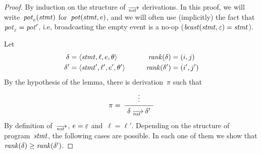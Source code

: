 
\lemranknst*
\begin{proof}
  By induction on the structure of $\nst$ derivations.  In this proof, we
  will write~$\operatorname{\mathit{pot}}_e(\mathit{stmt})$ for~$\operatorname{\mathit{pot}}(\mathit{stmt},e)$, and we will often use
  (implicitly) the fact that~$\operatorname{\mathit{pot}}_\varepsilon=\operatorname{\mathit{pot}}'$, i.e, broadcasting the empty
  event is a no-op ($\operatorname{\mathit{bcast}}(\mathit{stmt},\varepsilon)=\mathit{stmt}$).

  Let
  \begin{alignat*}{2}
    \delta&=\<\stmt,\ell,e,\theta>      &\qquad\rank(\delta)&=(i,j)\\
    \delta'&=\<\stmt',\ell',e',\theta'> &\qquad\rank(\delta')&=(i',j')
  \end{alignat*}
  By the hypothesis of the lemma, there is derivation~$\pi$ such that
  \[
    \AxiomC{\strut$\vdots$}
    \LeftLabel{\strut$\pi=\null$}
    \UnaryInfC{\strut$\delta\nst\delta'$}
    \DisplayProof
  \]
  By definition of~$\nst$, $e=\varepsilon$ and~$\ell=\ell'$.  Depending on the
  structure of program~$\mathit{stmt}$, the following cases are possible.  In each
  one of them we show that $\operatorname{\mathit{rank}}(\delta)\ge\operatorname{\mathit{rank}}(\delta')$.


\end{proof}
